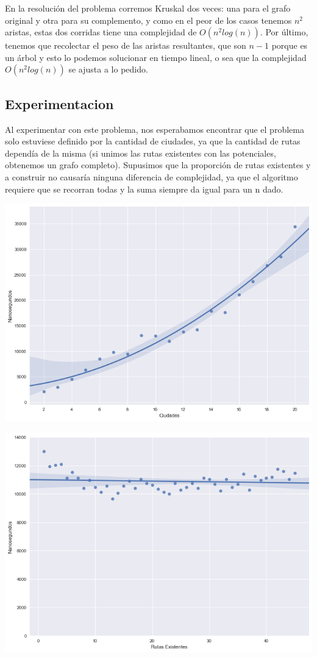 En la resolución del problema corremos Kruskal dos veces: una para el grafo original y otra para su complemento, y como en el peor de los casos tenemos $n^2$ aristas, estas dos corridas tiene una complejidad de $O(n^2log(n))$. Por último, tenemos que recolectar el peso de las aristas resultantes, que son $n-1$ porque es un árbol y esto lo podemos solucionar en tiempo lineal, o sea que la complejidad $O(n^2log(n))$ se ajusta a lo pedido.


\subsection{Experimentacion}

Al experimentar con este problema, nos esperabamos encontrar que el problema solo estuviese definido por la cantidad de ciudades, ya que la cantidad de rutas dependía de la misma (si unimos las rutas existentes con las potenciales, obtenemos un grafo completo). Supusimos que la proporción de rutas existentes y a construir no causaría ninguna diferencia de complejidad, ya que el algoritmo requiere que se recorran todas y la suma siempre da igual para un n dado.

\begin{center}
	\includegraphics[scale=0.5]{imagenes/ej3-1.png}

	\includegraphics[scale=0.5]{imagenes/ej3-2.png}
\end{center}


